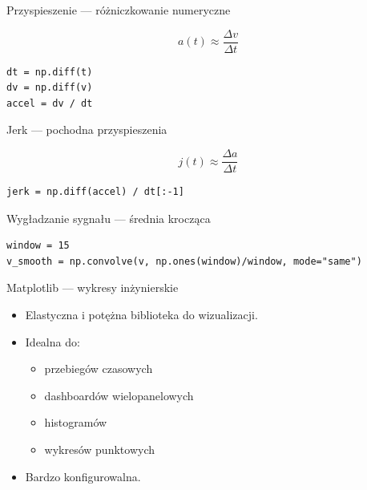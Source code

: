 \documentclass[aspectratio=169]{beamer}
\begin{document}
\begin{frame}[fragile]{Przyspieszenie — różniczkowanie numeryczne}

\begin{equation}
a(t) \approx \frac{\Delta v}{\Delta t}
\end{equation}

\begin{verbatim}
dt = np.diff(t)
dv = np.diff(v)
accel = dv / dt
\end{verbatim}
\end{frame}

\begin{frame}[fragile]{Jerk — pochodna przyspieszenia}

\begin{equation}
j(t) \approx \frac{\Delta a}{\Delta t}
\end{equation}

\begin{verbatim}
jerk = np.diff(accel) / dt[:-1]
\end{verbatim}
\end{frame}

\begin{frame}[fragile]{Wygładzanie sygnału — średnia krocząca}
\begin{verbatim}
window = 15
v_smooth = np.convolve(v, np.ones(window)/window, mode="same")
\end{verbatim}
\end{frame}

\begin{frame}{Matplotlib — wykresy inżynierskie}
  \begin{itemize}
    \item Elastyczna i potężna biblioteka do wizualizacji.
    \item Idealna do:
      \begin{itemize}
        \item przebiegów czasowych
        \item dashboardów wielopanelowych
        \item histogramów
        \item wykresów punktowych
      \end{itemize}
    \item Bardzo konfigurowalna.
  \end{itemize}
\end{frame}
\end{document}
